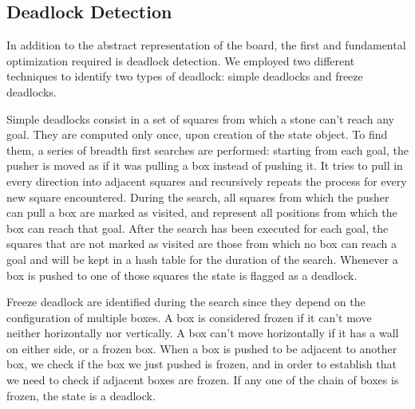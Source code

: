 \subsection{Deadlock Detection}
In addition to the abstract representation of the board, the first and fundamental optimization required is deadlock detection. We employed two different techniques to identify two types of deadlock: simple deadlocks and freeze deadlocks.

\medskip\noindent
Simple deadlocks consist in a set of squares from which a stone can't reach any goal. They are computed only once, upon creation of the state object. To find them, a series of breadth first searches are performed: starting from each goal, the pusher is moved as if it was pulling a box instead of pushing it. It tries to pull in every direction into adjacent squares and recursively repeats the process for every new square encountered. During the search, all squares from which the pusher can pull a box are marked as visited, and represent all positions from which the box can reach that goal. After the search has been executed for each goal, the squares that are not marked as visited are those from which no box can reach a goal and will be kept in a hash table for the duration of the search. Whenever a box is pushed to one of those squares the state is flagged as a deadlock.

\medskip\noindent
Freeze deadlock are identified during the search since they depend on the configuration of multiple boxes. A box is considered frozen if it can't move neither horizontally nor vertically. A box can't move horizontally if it has a wall on either side, or a frozen box. When a box is pushed to be adjacent to another box, we check if the box we just pushed is frozen, and in order to establish that we need to check if adjacent boxes are frozen. If any one of the chain of boxes is frozen, the state is a deadlock.

